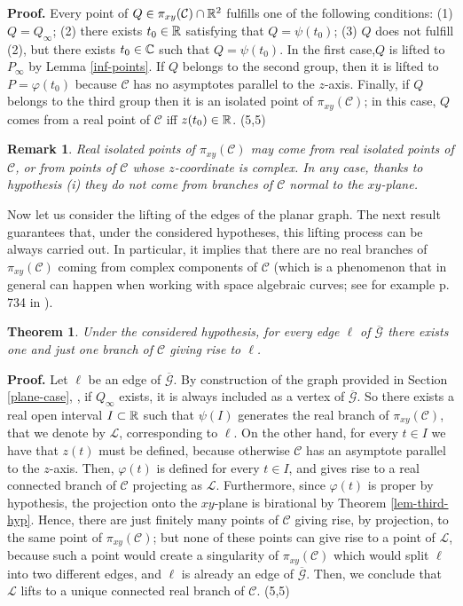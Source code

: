 \documentclass{elsart}
\def\qed{\hfill  \framebox(5,5){}}
\newtheorem{theorem}{{\bf Theorem}}
\newtheorem{remark}{{\bf Remark}}
\begin{document}
{\bf Proof.} Every point of $Q\in \pi_{xy}({\mathcal C})\cap {\Bbb
R}^2$ fulfills one of the following conditions: (1)
$Q=Q_{\infty}$; (2) there exists $t_0\in {\Bbb R}$ satisfying that
$Q=\psi(t_0)$; (3) $Q$ does not fulfill (2), but there exists
$t_0\in {\Bbb C}$ such that $Q=\psi(t_0)$. In the first case,$Q$
is lifted to $P_{\infty}$ by Lemma \ref{inf-points}.  If $Q$
belongs to the second group, then it is lifted to $P=\varphi(t_0)$
because ${\mathcal C}$ has no asymptotes parallel to the $z$-axis.
Finally, if $Q$ belongs to the third group then it is an isolated
point of $\pi_{xy}({\mathcal C})$; in this case, $Q$ comes from a
real point of ${\mathcal C}$ iff $z(t_0)\in {\Bbb R}$. \qed

\begin{remark} \label{rem-isol}
Real isolated points of $\pi_{xy}({\mathcal C})$ may come from real isolated points of ${\mathcal C}$, or from points of ${\mathcal C}$ whose $z$-coordinate is complex. In any case, thanks to hypothesis (i) they do not come from branches of ${\mathcal C}$ normal to the $xy$-plane.
\end{remark}


Now let us consider the lifting of the edges of the planar graph.
The next result guarantees that, under the considered hypotheses,
this lifting process can be always carried out. In particular, it
implies that there are no real branches of $\pi_{xy}({\mathcal
C})$ coming from complex components of ${\mathcal C}$ (which is a
phenomenon that in general can happen when working with space
algebraic curves; see for example p. 734 in \cite{JG-Sendra}).

\begin{theorem} \label{th-edges-lift}
Under the considered hypothesis, for every edge $\ell$ of $\overline{\mathcal G}$ there exists one and just one branch of ${\mathcal C}$ giving rise to $\ell$.
\end{theorem}

{\bf Proof.} Let $\ell$ be an edge of $\overline{\mathcal G}$. By
construction of the graph provided in Section \ref{plane-case}, ,
if $Q_{\infty}$ exists, it is always included as a vertex of
$\overline{\mathcal G}$. So there exists a real open interval
$I\subset {\Bbb R}$ such that $\psi(I)$ generates the real branch
of $\pi_{xy}({\mathcal C})$, that we denote by ${\mathcal L}$,
corresponding to $\ell$. On the other hand, for every $t\in I$ we
have that $z(t)$ must be defined, because otherwise ${\mathcal C}$
has an asymptote parallel to the $z$-axis. Then, $\varphi(t)$ is
defined for every $t\in I$, and gives rise to a real connected
branch of ${\mathcal C}$ projecting as ${\mathcal L}$.
Furthermore, since $\varphi(t)$ is proper by hypothesis, the
projection onto the $xy$-plane is birational by Theorem
\ref{lem-third-hyp}. Hence, there are just finitely many points of
${\mathcal C}$ giving rise, by projection, to the same point of
$\pi_{xy}({\mathcal C})$; but none of these points can give rise
to a point of ${\mathcal L}$, because such a point would create a
singularity of $\pi_{xy}({\mathcal C})$ which would split $\ell$
into two different edges, and $\ell$ is already an edge of
$\overline{\mathcal G}$. Then, we conclude that ${\mathcal L}$
lifts to a unique connected real branch of ${\mathcal C}$. \qed
\end{document}

